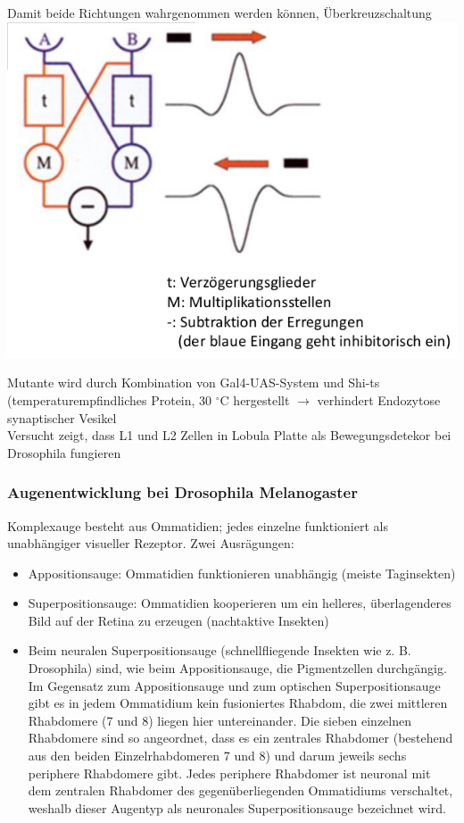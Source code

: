 Damit beide Richtungen wahrgenommen werden können, Überkreuzschaltung\\
\includegraphics[width=1\textwidth]{lectures/160511/pix/bidirectional_motiondetection.png}

Mutante wird durch Kombination von Gal4-UAS-System und Shi-ts (temperaturempfindliches Protein, 30 $^\circ$C hergestellt $\rightarrow$ verhindert Endozytose synaptischer Vesikel\\
Versucht zeigt, dass L1 und L2 Zellen in Lobula Platte als Bewegungsdetekor bei Drosophila fungieren\\

\subsubsection{Augenentwicklung bei Drosophila Melanogaster}
Komplexauge besteht aus Ommatidien; jedes einzelne funktioniert als unabhängiger visueller Rezeptor. Zwei Ausrägungen:
\begin{itemize}
	\item Appositionsauge: Ommatidien funktionieren unabhängig (meiste Taginsekten)
	\item Superpositionsauge: Ommatidien kooperieren um ein helleres, überlagenderes Bild auf der Retina zu erzeugen (nachtaktive Insekten)
	\item Beim neuralen Superpositionsauge (schnellfliegende Insekten wie z. B. Drosophila) sind, wie beim Appositionsauge, die Pigmentzellen durchgängig. Im Gegensatz zum Appositionsauge und zum optischen Superpositionsauge gibt es in jedem Ommatidium kein fusioniertes Rhabdom, die zwei mittleren Rhabdomere (7 und 8) liegen hier untereinander. Die sieben einzelnen Rhabdomere sind so angeordnet, dass es ein zentrales Rhabdomer (bestehend aus den beiden Einzelrhabdomeren 7 und 8) und darum jeweils sechs periphere Rhabdomere gibt. Jedes periphere Rhabdomer ist neuronal mit dem zentralen Rhabdomer des gegenüberliegenden Ommatidiums verschaltet, weshalb dieser Augentyp als neuronales Superpositionsauge bezeichnet wird.
\end{itemize}

